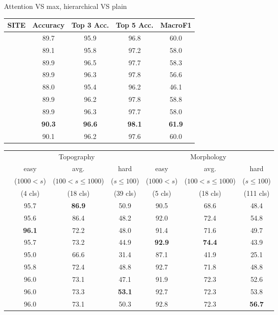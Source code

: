 \begin{frame}{Attention VS max, hierarchical VS plain}
  \small
  \begin{center}
    \begin{tabular}{ccccc}
    \hline
    \textbf{SITE}&Accuracy&Top 3 Acc.&Top 5 Acc.&MacroF1\\
    \hline
    \svm{}     &89.7&95.9&96.8&60.0\\
    \xgb{}     &89.1&95.8&97.2&58.0\\
    \hline
    \gru{}     &89.9&96.5&97.7&58.3\\
    \bert{}    &89.9&96.3&97.8&56.6\\
    \hline
    \maxi{}    &88.0&95.4&96.2&46.1\\
    \maxh{}    &89.9&96.2&97.8&58.8\\
    \softmaxh{}&89.9&96.3&97.7&58.0\\
    \maxp{}    &\textbf{90.3}&\textbf{96.6}&\textbf{98.1}&\textbf{61.9}\\
    \softmax{} &90.1&96.2&97.6&60.0\\
    \hline
    \end{tabular}
        \tiny
    \begin{tabular}{cccc|ccc}
    \hline
    &\multicolumn{3}{c}{Topography}&\multicolumn{3}{c}{Morphology}\\
        &easy&avg.&hard&easy&avg.&hard\\
        &($1000<s$)&($100<s\leq 1000$)&($s\leq 100$)&($1000<s$)&($100<s\leq 1000$)&($s\leq 100$)\\
    &(4 cls)&(18 cls)&(39 cls)&(5 cls)&(18 cls)&(111 cls)\\
    \hline
    \svm{}     &95.7&\textbf{86.9}&50.9&90.5&68.6&48.4\\
    \xgb{}     &95.6&86.4&48.2&92.0&72.4&54.8\\
    \hline
    \gru{}     &\textbf{96.1}&72.2&48.0&91.4&71.6&49.7\\
    \bert{}    &95.7&73.2&44.9&\textbf{92.9}&\textbf{74.4}&43.9\\    
    \hline
    \maxi{}    &95.0&66.6&31.4&87.1&41.9&25.1\\
    \maxh{}    &95.8&72.4&48.8&92.7&71.8&48.8\\
    \softmaxh{}&96.0&73.1&47.1&91.9&72.3&52.6\\
    \maxp{}    &96.0&73.3&\textbf{53.1}&92.7&72.3&53.8\\
    \softmax{} &96.0&73.1&50.3&92.8&72.3&\textbf{56.7}\\
    \hline
  \end{tabular}

  \end{center}
\end{frame}

